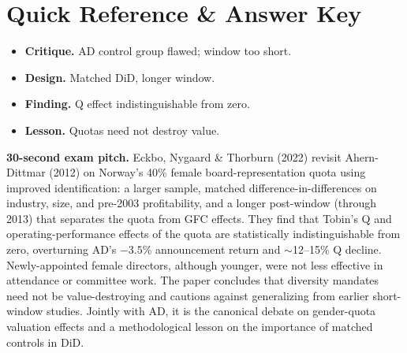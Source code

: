 \documentclass[11pt]{article}
\begin{document}
\section*{Quick Reference \& Answer Key}
\begin{answerbox}
\begin{itemize}
\item \textbf{Critique.} AD control group flawed; window too short.
\item \textbf{Design.} Matched DiD, longer window.
\item \textbf{Finding.} Q effect indistinguishable from zero.
\item \textbf{Lesson.} Quotas need not destroy value.
\end{itemize}
\end{answerbox}

\begin{keybox}
\textbf{30-second exam pitch.} Eckbo, Nygaard \& Thorburn (2022) revisit Ahern-Dittmar (2012) on Norway's 40\% female board-representation quota using improved identification: a larger sample, matched difference-in-differences on industry, size, and pre-2003 profitability, and a longer post-window (through 2013) that separates the quota from GFC effects. They find that Tobin's Q and operating-performance effects of the quota are statistically indistinguishable from zero, overturning AD's $-3.5$\% announcement return and $\sim$12--15\% Q decline. Newly-appointed female directors, although younger, were not less effective in attendance or committee work. The paper concludes that diversity mandates need not be value-destroying and cautions against generalizing from earlier short-window studies. Jointly with AD, it is the canonical debate on gender-quota valuation effects and a methodological lesson on the importance of matched controls in DiD.
\end{keybox}
\end{document}
